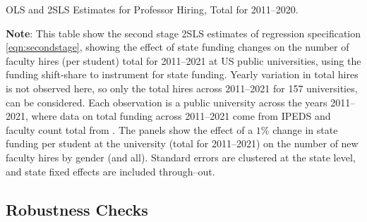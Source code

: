 \begin{table}[h!]
    \singlespacing
    \centering
    \caption{OLS and 2SLS Estimates for Professor Hiring, Total for 2011--2020.}
    \makebox[\textwidth][c]{}
    \label{tab:hiring-shock-reg}
    \justify
    \footnotesize
    \textbf{Note}: 
    This table show the second stage 2SLS estimates of regression specification \eqref{eqn:secondstage}, showing the effect of state funding changes on the number of faculty hires (per student) total for 2011--2021 at US public universities, using the funding shift-share to instrument for state funding.
    Yearly variation in total hires is not observed here, so only the total hires across 2011--2021 for 157 universities, can be considered.
    Each observation is a public university across the years 2011--2021, where data on total funding across 2011--2021 come from IPEDS and faculty count total from \citep{wapman2022quantifying,wapman2022zenodo}.
    The panels show the effect of a $1$\% change in state funding per student at the university (total for 2011--2021) on the number of new faculty hires by gender (and all).
    Standard errors are clustered at the state level, and state fixed effects are included through--out.
\end{table}

\newpage
\subsection{Robustness Checks}

